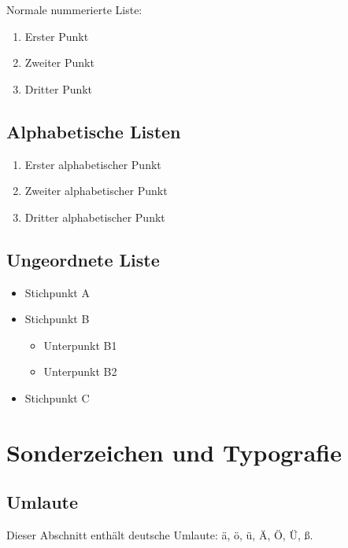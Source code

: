 \documentclass[
  ngerman,
]{article}
\providecommand{\tightlist}{%
  \setlength{\itemsep}{0pt}\setlength{\parskip}{0pt}}
\begin{document}
Normale nummerierte Liste:

\begin{enumerate}
\def\labelenumi{\arabic{enumi}.}
\tightlist
\item
  Erster Punkt
\item
  Zweiter Punkt
\item
  Dritter Punkt
\end{enumerate}

\subsection{Alphabetische Listen}\label{alphabetische-listen}

\begin{enumerate}[label=\alph*.]
  \item Erster alphabetischer Punkt
  \item Zweiter alphabetischer Punkt
  \item Dritter alphabetischer Punkt
\end{enumerate}

\subsection{Ungeordnete Liste}\label{ungeordnete-liste}

\begin{itemize}
\tightlist
\item
  Stichpunkt A
\item
  Stichpunkt B

  \begin{itemize}
  \tightlist
  \item
    Unterpunkt B1
  \item
    Unterpunkt B2
  \end{itemize}
\item
  Stichpunkt C
\end{itemize}

\section{Sonderzeichen und
Typografie}\label{sonderzeichen-und-typografie}

\subsection{Umlaute}\label{umlaute}

Dieser Abschnitt enthält deutsche Umlaute: ä, ö, ü, Ä, Ö, Ü, ß.
\end{document}
